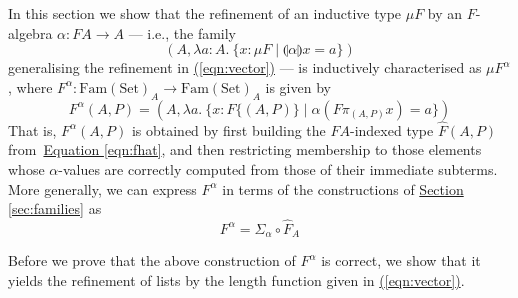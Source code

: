 \documentclass{LMCS}
\newcommand{\sepbar}{\mathrel|}
\newcommand{\fold}[1]{\llparenthesis #1 \rrparenthesis}
\newcommand{\Fam}{\mathrm{Fam}}
\newcommand{\Set}{\mathrm{Set}}
\newcommand{\parenref}[1]{\hyperref[#1]{(\ref*{#1})}}
\begin{document}
In this section we show that the refinement of an
inductive type $\mu F$ by an $F$-algebra $\alpha : FA \to A$ --- i.e.,
the family
\begin{equation}\label{eqn:muFalpha}
  (A, \lambda a:A.\ \{ x : \mu F \sepbar \fold{\alpha} x = a \})
\end{equation}
generalising the refinement in \parenref{eqn:vector} --- is
inductively characterised as $\mu F^\alpha$, where $F^\alpha :
\Fam(\Set)_A \to \Fam(\Set)_A$ is given by
\begin{equation}
  \label{eqn:Falpha-set}
  F^\alpha (A,P) = (A,\lambda a.\ \{ x : F \{(A,P)\} \sepbar
  \alpha(F\pi_{(A,P)} x) = a \}) 
\end{equation}
\noindent
That is, $F^{\alpha}(A,P)$ is obtained by first building the
$FA$-indexed type $\hat{F}(A,P)$ from~\hyperref[eqn:fhat]{Equation
  \ref*{eqn:fhat}}, and then restricting membership to those elements
whose $\alpha$-values are correctly computed from those of their
immediate subterms. More generally, we can express $F^\alpha$ in terms
of the constructions of \hyperref[sec:families]{Section
  \ref*{sec:families}} as 
\begin{equation}
  \label{eqn:Falpha}
  F^\alpha = \Sigma_\alpha \circ \hat{F}_A
\end{equation}

Before we prove that the above construction of $F^\alpha$ is correct,
we show that it yields the refinement of lists by the length function
given in \parenref{eqn:vector}.
\end{document}
